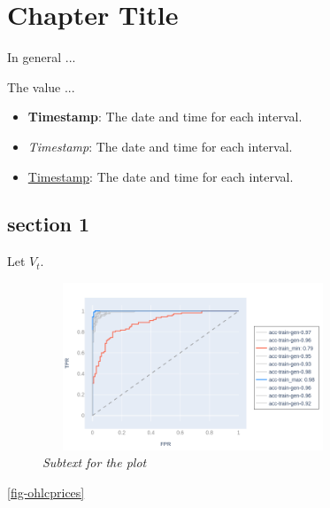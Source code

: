 
\chapter{ Chapter Title } \label{chapter-fml}

\minitoc

In general ...

\newpage

The value ... 

\vskip0.1in

\begin{itemize}
    \item \textbf{Timestamp}: The date and time for each interval.
    \item \textit{Timestamp}: The date and time for each interval.
    \item \underline{Timestamp}: The date and time for each interval.
\end{itemize}

\section{ section 1}

Let $V_{t}$.

\vskip0.1in

\begin{figure}
    \centering
    \includegraphics[width=9cm, height=5cm, keepaspectratio=false]{figures/plot-rocs.png}
    \caption{\footnotesize \textit{Subtext for the plot}}
    \label{fig-ohlcprices}
\end{figure}

\autoref{fig-ohlcprices}